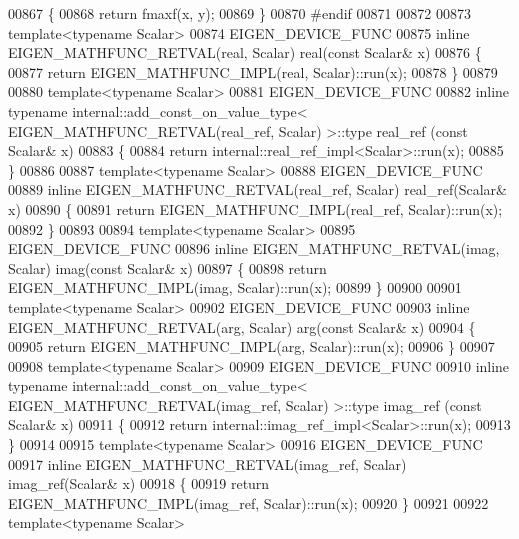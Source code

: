 \begin{DoxyCode}
00867 \{
00868   \textcolor{keywordflow}{return} fmaxf(x, y);
00869 \}
00870 \textcolor{preprocessor}{#endif}
00871 
00872 
00873 \textcolor{keyword}{template}<\textcolor{keyword}{typename} Scalar>
00874 EIGEN\_DEVICE\_FUNC
00875 \textcolor{keyword}{inline} EIGEN\_MATHFUNC\_RETVAL(real, Scalar) real(\textcolor{keyword}{const} Scalar& x)
00876 \{
00877   \textcolor{keywordflow}{return} EIGEN\_MATHFUNC\_IMPL(real, Scalar)::run(x);
00878 \}
00879 
00880 \textcolor{keyword}{template}<\textcolor{keyword}{typename} Scalar>
00881 EIGEN\_DEVICE\_FUNC
00882 \textcolor{keyword}{inline} \textcolor{keyword}{typename} internal::add\_const\_on\_value\_type< EIGEN\_MATHFUNC\_RETVAL(real\_ref, Scalar) >::type real\_ref
      (\textcolor{keyword}{const} Scalar& x)
00883 \{
00884   \textcolor{keywordflow}{return} internal::real\_ref\_impl<Scalar>::run(x);
00885 \}
00886 
00887 \textcolor{keyword}{template}<\textcolor{keyword}{typename} Scalar>
00888 EIGEN\_DEVICE\_FUNC
00889 \textcolor{keyword}{inline} EIGEN\_MATHFUNC\_RETVAL(real\_ref, Scalar) real\_ref(Scalar& x)
00890 \{
00891   \textcolor{keywordflow}{return} EIGEN\_MATHFUNC\_IMPL(real\_ref, Scalar)::run(x);
00892 \}
00893 
00894 \textcolor{keyword}{template}<\textcolor{keyword}{typename} Scalar>
00895 EIGEN\_DEVICE\_FUNC
00896 \textcolor{keyword}{inline} EIGEN\_MATHFUNC\_RETVAL(imag, Scalar) imag(\textcolor{keyword}{const} Scalar& x)
00897 \{
00898   \textcolor{keywordflow}{return} EIGEN\_MATHFUNC\_IMPL(imag, Scalar)::run(x);
00899 \}
00900 
00901 \textcolor{keyword}{template}<\textcolor{keyword}{typename} Scalar>
00902 EIGEN\_DEVICE\_FUNC
00903 \textcolor{keyword}{inline} EIGEN\_MATHFUNC\_RETVAL(arg, Scalar) arg(\textcolor{keyword}{const} Scalar& x)
00904 \{
00905   \textcolor{keywordflow}{return} EIGEN\_MATHFUNC\_IMPL(arg, Scalar)::run(x);
00906 \}
00907 
00908 \textcolor{keyword}{template}<\textcolor{keyword}{typename} Scalar>
00909 EIGEN\_DEVICE\_FUNC
00910 \textcolor{keyword}{inline} \textcolor{keyword}{typename} internal::add\_const\_on\_value\_type< EIGEN\_MATHFUNC\_RETVAL(imag\_ref, Scalar) >::type imag\_ref
      (\textcolor{keyword}{const} Scalar& x)
00911 \{
00912   \textcolor{keywordflow}{return} internal::imag\_ref\_impl<Scalar>::run(x);
00913 \}
00914 
00915 \textcolor{keyword}{template}<\textcolor{keyword}{typename} Scalar>
00916 EIGEN\_DEVICE\_FUNC
00917 \textcolor{keyword}{inline} EIGEN\_MATHFUNC\_RETVAL(imag\_ref, Scalar) imag\_ref(Scalar& x)
00918 \{
00919   \textcolor{keywordflow}{return} EIGEN\_MATHFUNC\_IMPL(imag\_ref, Scalar)::run(x);
00920 \}
00921 
00922 \textcolor{keyword}{template}<\textcolor{keyword}{typename} Scalar>

\end{DoxyCode}
